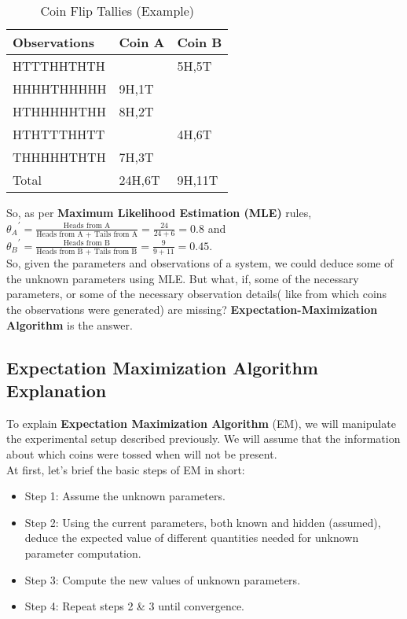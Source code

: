 \begin{table}[]
\centering
\caption{Coin Flip Tallies (Example)}
\label{exp2}

\begin{tabular}{|l|l|l|}
\hline
	Observations & Coin A & Coin B\\
\hline
	HTTTHHTHTH &  & 5H,5T\\
\hline
	HHHHTHHHHH & 9H,1T & \\
\hline
	HTHHHHHTHH & 8H,2T & \\
\hline
	HTHTTTHHTT &  & 4H,6T\\
\hline
	THHHHHTHTH & 7H,3T & \\
\hline
	Total & 24H,6T & 9H,11T\\
\hline
\end{tabular}
\end{table}
So, as per \textbf{Maximum Likelihood Estimation (MLE)} rules, ${\theta_{A}}^{\prime}=\frac{\text{Heads from A}}{\text{Heads from A + Tails from A}}=\frac{24}{24+6}=0.8$ and ${\theta_{B}}^{\prime}=\frac{\text{Heads from B}}{\text{Heads from B + Tails from B}}=\frac{9}{9+11}=0.45$.\\
So, given the parameters and observations of a system, we could deduce some of the unknown parameters using MLE. But what, if, some of the necessary parameters, or some of the necessary observation details( like from which coins the observations were generated) are missing? \textbf{Expectation-Maximization Algorithm} is the answer.

\subsection{Expectation Maximization Algorithm Explanation}

To explain \textbf{Expectation Maximization Algorithm} (EM), we will manipulate the experimental setup described previously. We will assume that the information about which coins were tossed when will not be present.\\
At first, let's brief the basic steps of EM in short:
\begin{itemize}
\item Step 1: Assume the unknown parameters.
\item Step 2: Using the current parameters, both known and hidden (assumed), deduce the expected value of different quantities needed for unknown parameter computation.
\item Step 3: Compute the new values of unknown parameters.
\item Step 4: Repeat steps 2 \& 3 until convergence.

\end{itemize} 

